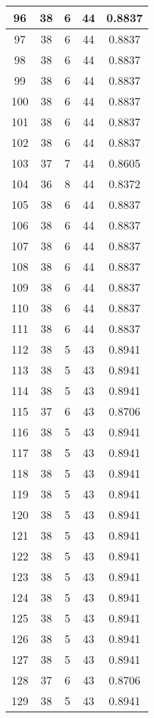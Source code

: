 \documentclass[letterpaper, 12pt]{article}
\begin{document}
\begin{longtable}{|c|c|c|c|c|}
\hline
96 & 38 & 6 & 44 & 0.8837 \\
\hline
97 & 38 & 6 & 44 & 0.8837 \\
\hline
98 & 38 & 6 & 44 & 0.8837 \\
\hline
99 & 38 & 6 & 44 & 0.8837 \\
\hline
100 & 38 & 6 & 44 & 0.8837 \\
\hline
101 & 38 & 6 & 44 & 0.8837 \\
\hline
102 & 38 & 6 & 44 & 0.8837 \\
\hline
103 & 37 & 7 & 44 & 0.8605 \\
\hline
104 & 36 & 8 & 44 & 0.8372 \\
\hline
105 & 38 & 6 & 44 & 0.8837 \\
\hline
106 & 38 & 6 & 44 & 0.8837 \\
\hline
107 & 38 & 6 & 44 & 0.8837 \\
\hline
108 & 38 & 6 & 44 & 0.8837 \\
\hline
109 & 38 & 6 & 44 & 0.8837 \\
\hline
110 & 38 & 6 & 44 & 0.8837 \\
\hline
111 & 38 & 6 & 44 & 0.8837 \\
\hline
112 & 38 & 5 & 43 & 0.8941 \\
\hline
113 & 38 & 5 & 43 & 0.8941 \\
\hline
114 & 38 & 5 & 43 & 0.8941 \\
\hline
115 & 37 & 6 & 43 & 0.8706 \\
\hline
116 & 38 & 5 & 43 & 0.8941 \\
\hline
117 & 38 & 5 & 43 & 0.8941 \\
\hline
118 & 38 & 5 & 43 & 0.8941 \\
\hline
119 & 38 & 5 & 43 & 0.8941 \\
\hline
120 & 38 & 5 & 43 & 0.8941 \\
\hline
121 & 38 & 5 & 43 & 0.8941 \\
\hline
122 & 38 & 5 & 43 & 0.8941 \\
\hline
123 & 38 & 5 & 43 & 0.8941 \\
\hline
124 & 38 & 5 & 43 & 0.8941 \\
\hline
125 & 38 & 5 & 43 & 0.8941 \\
\hline
126 & 38 & 5 & 43 & 0.8941 \\
\hline
127 & 38 & 5 & 43 & 0.8941 \\
\hline
128 & 37 & 6 & 43 & 0.8706 \\
\hline
129 & 38 & 5 & 43 & 0.8941 \\

\end{longtable}
\end{document}
